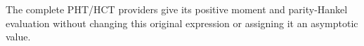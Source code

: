 The complete PHT/HCT providers give its positive moment
and parity-Hankel evaluation without changing this original
expression or assigning it an asymptotic value.